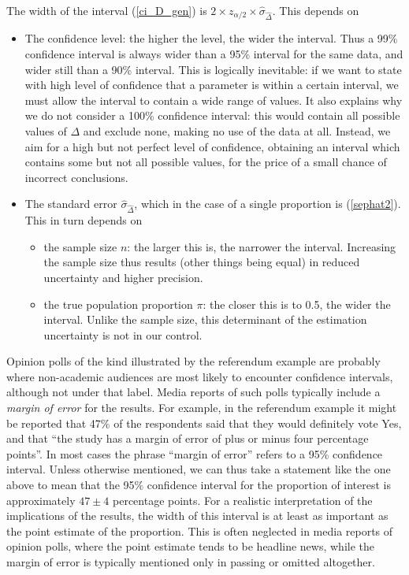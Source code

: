 The width of the interval (\ref{ci_D_gen}) is
$2\times z_{\alpha/2}\times \hat{\sigma}_{\hat{\Delta}}$.
This depends on
\begin{itemize}
\item
The confidence level: the higher the level, the wider the interval. Thus
a 99\% confidence interval is always wider than a 95\% interval for the
same data, and wider still than a 90\% interval. This is logically
inevitable: if we want to state with high level of confidence that a
parameter is within a certain interval, we must allow the
interval to contain a wide range of values. It also explains why we do
not consider a 100\% confidence interval: this would contain all
possible values of $\Delta$ and exclude none, making no use of
the data at all. Instead, we aim for a high but not perfect level of
confidence, obtaining an interval which contains some but not all
possible values, for the price of a small chance of incorrect conclusions.
\item
The standard error $\hat{\sigma}_{\hat{\Delta}}$, which in the
case of a single proportion is (\ref{sephat2}).
This in turn depends on
\begin{itemize}
\item
the sample size $n$: the larger this is, the narrower the interval.
Increasing the sample size thus results (other things being
equal) in reduced uncertainty and higher precision.
\item
the true population proportion $\pi$:
the closer this is to 0.5, the wider the interval.
Unlike the sample size, this determinant
of the estimation uncertainty is not in our control.
\end{itemize}
\end{itemize}
Opinion polls of the kind illustrated by the referendum example are probably
where non-academic audiences are most likely to encounter confidence
intervals, although not under that label. Media reports of such polls
typically include a \emph{margin of error} for the results. For example,
in the referendum example it might be reported that
47\% of the respondents said that they would definitely vote Yes, and
that ``the study has a margin of error of plus or
minus four percentage points''.
In most cases the phrase ``margin of
error'' refers to a 95\% confidence interval. Unless otherwise
mentioned, we can thus take a statement like the one above to mean that
the 95\% confidence interval for the proportion of interest is
approximately $47\pm 4$
percentage points. For a realistic interpretation of the implications of
the results, the width of this interval is at least as important as the
point estimate of the proportion. This is often neglected in media
reports of opinion polls, where the point estimate tends to be headline
news, while the margin of error is typically mentioned only in passing
or omitted altogether.

